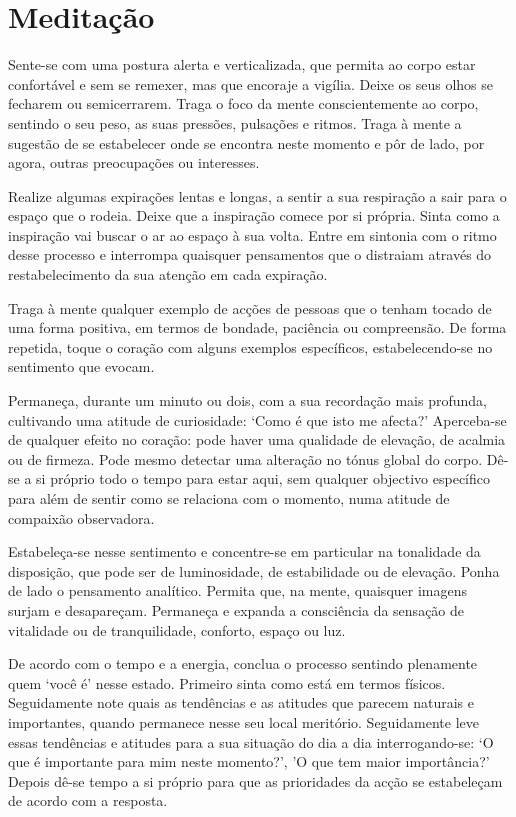 
\chapter{Meditação}


Sente-se com uma postura alerta e verticalizada, que permita ao corpo estar confortável e sem se remexer, mas que encoraje a vigília. Deixe os seus olhos se fecharem ou semicerrarem. Traga o foco da mente conscientemente ao corpo, sentindo o seu peso, as suas pressões, pulsações e ritmos. Traga à mente a sugestão de se estabelecer onde se encontra neste momento e pôr de lado, por agora, outras preocupações ou interesses.

Realize algumas expirações lentas e longas, a sentir a sua respiração a sair para o espaço que o rodeia. Deixe que a inspiração comece por si própria. Sinta como a inspiração vai buscar o ar ao espaço à sua volta. Entre em sintonia com o ritmo desse processo e interrompa quaisquer pensamentos que o distraiam através do restabelecimento da sua atenção em cada expiração.

Traga à mente qualquer exemplo de acções de pessoas que o tenham tocado de uma forma positiva, em termos de bondade, paciência ou compreensão. De forma repetida, toque o coração com alguns exemplos específicos, estabelecendo-se no sentimento que evocam.

Permaneça, durante um minuto ou dois, com a sua recordação mais profunda, cultivando uma atitude de curiosidade: `Como é que isto me afecta?' Aperceba-se de qualquer efeito no coração: pode haver uma qualidade de elevação, de acalmia ou de firmeza. Pode mesmo detectar uma alteração no tónus global do corpo. Dê-se a si próprio todo o tempo para estar aqui, sem qualquer objectivo específico para além de sentir como se relaciona com o momento, numa atitude de compaixão observadora.

Estabeleça-se nesse sentimento e concentre-se em particular na tonalidade da disposição, que pode ser de luminosidade, de estabilidade ou de elevação. Ponha de lado o pensamento analítico. Permita que, na mente, quaisquer imagens surjam e desapareçam. Permaneça e expanda a consciência da sensação de vitalidade ou de tranquilidade, conforto, espaço ou luz.

De acordo com o tempo e a energia, conclua o processo sentindo plenamente quem `você é' nesse estado. Primeiro sinta como está em termos físicos. Seguidamente note quais as tendências e as atitudes que parecem naturais e importantes, quando permanece nesse seu local meritório. Seguidamente leve essas tendências e atitudes para a sua situação do dia a dia interrogando-se: `O que é importante para mim neste momento?', 'O que tem maior importância?' Depois dê-se tempo a si próprio para que as prioridades da acção se estabeleçam de acordo com a resposta.
